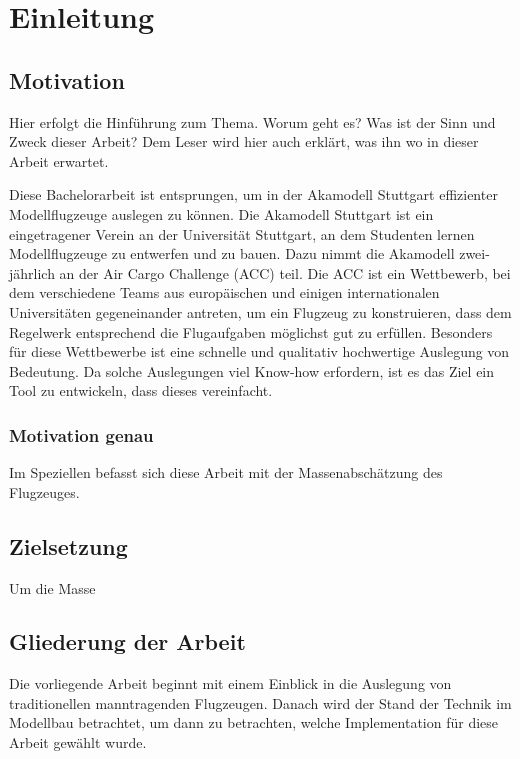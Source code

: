 \chapter{Einleitung}					%
\label{chap:einleitung}					%

\section{Motivation}					%
\label{sec:motivation}
Hier erfolgt die Hinführung zum Thema. Worum geht es? Was ist der Sinn und Zweck dieser Arbeit? Dem Leser wird hier auch erklärt, was ihn wo in dieser Arbeit erwartet.

Diese Bachelorarbeit ist entsprungen, um in der Akamodell Stuttgart effizienter Modellflugzeuge auslegen zu können. Die Akamodell Stuttgart ist ein eingetragener Verein an der Universität Stuttgart, an dem Studenten lernen Modellflugzeuge zu entwerfen und zu bauen. Dazu nimmt die Akamodell zwei-jährlich an der Air Cargo Challenge (ACC) teil. Die ACC ist ein Wettbewerb, bei dem verschiedene Teams aus europäischen und einigen internationalen Universitäten gegeneinander antreten, um ein Flugzeug zu konstruieren, dass dem Regelwerk entsprechend die Flugaufgaben möglichst gut zu erfüllen. Besonders für diese Wettbewerbe ist eine schnelle und qualitativ hochwertige Auslegung von Bedeutung. Da solche Auslegungen viel Know-how erfordern, ist es das Ziel ein Tool zu entwickeln, dass dieses vereinfacht.

\subsection{Motivation genau}			%
\label{subsec:motgenau}

Im Speziellen befasst sich diese Arbeit mit der Massenabschätzung des Flugzeuges.

\section{Zielsetzung}
\label{sec:zielsetzung}
 Um die Masse 

\section{Gliederung der Arbeit}
\label{sec:gliederung}
Die vorliegende Arbeit beginnt mit einem Einblick in die Auslegung von traditionellen manntragenden Flugzeugen. Danach wird der Stand der Technik im Modellbau betrachtet, um dann zu betrachten, welche Implementation für diese Arbeit gewählt wurde.
